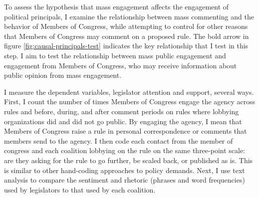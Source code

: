 
To assess the hypothesis that mass engagement affects the engagement of political principals, I examine the relationship between mass commenting and the behavior of Members of Congress, while attempting to control for other reasons that Members of Congress may comment on a proposed rule. The bold arrow in figure \ref{fig:causal-principals-test} indicates the key relationship that I test in this step. I aim to test the relationship between mass public engagement and engagement from Members of Congress, who may receive information about public opinion from mass engagement.



I measure the dependent variables, legislator attention and support, several ways. First, I count the number of times Members of Congress engage the agency across rules and before, during, and after comment periods on rules where lobbying organizations did and did not go public. By engaging the agency, I mean that Members of Congress raise a rule in %
personal correspondence or comments that members send to the agency.
I then code each contact from the member of congress and each coalition lobbying on the rule on the same three-point scale: are they asking for the rule to go further, be scaled back, or published as is. This is similar to other hand-coding approaches to policy demands.
Next, I use text analysis to compare the sentiment and rhetoric (phrases and word frequencies) used by legislators to that used by each coalition. %


